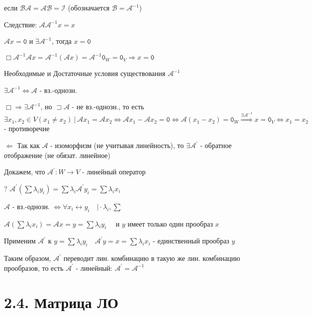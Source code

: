 \documentclass[12pt]{article}
\begin{document}
    если $\mathcal{B}\mathcal{A} = \mathcal{A}\mathcal{B} = \mathcal{I}$ (обозначается $\mathcal{B} = \mathcal{A}^{-1}$)

    Следствие: $\mathcal{A}\mathcal{A}^{-1} x = x$

    \Th $\mathcal{A}x = \texttt{0}$ и $\exists \mathcal{A}^{-1}$, тогда $x = \texttt{0}$

    $\Box \mathcal{A}^{-1}\mathcal{A} x = \mathcal{A}^{-1}(\mathcal{A} x) = \mathcal{A}^{-1} \texttt{0}_W = \texttt{0}_V \Longrightarrow x = \texttt{0}$

    \Th Необходимые и Достаточные условия существования $\mathcal{A}^{-1}$

    $\exists \mathcal{A}^{-1} \Longleftrightarrow \mathcal{A}$ - вз.-однозн.

    $\Box \Longrightarrow \exists \mathcal{A}^{-1}$, но $\sqsupset \mathcal{A}$ - не вз.-однозн., то есть
    $\exists x_1, x_2 \in V (x_1 \neq x_2) \ | \ \mathcal{A}x_1 = \mathcal{A}x_2 \Longleftrightarrow \mathcal{A}x_1 - \mathcal{A}x_2 = \texttt{0} \Longleftrightarrow
    \mathcal{A}(x_1 - x_2) = \texttt{0}_W \stackrel{\exists \mathcal{A}^{-1}}{\Longrightarrow} x = \texttt{0}_V \Longleftrightarrow x_1 = x_2$ - противоречие

    $\Longleftarrow$ Так как $\mathcal{A}$ - изоморфизм (не учитывая линейность), то $\exists \mathcal{A}^\prime$ - обратное отображение (не обязат. линейное)

    Докажем, что $\mathcal{A}^\prime : W \rightarrow V$ - линейный оператор

    ? $\mathcal{A}^\prime (\sum \lambda_i y_i) = \sum \lambda_i \mathcal{A}^\prime y_i = \sum \lambda_i x_i$

    $\mathcal{A}$ - вз.-однозн. $\Longleftrightarrow \forall x_i \longleftrightarrow y_i \quad \Big| \cdot \lambda_i, \sum$

    $\mathcal{A}(\sum \lambda_i x_i) = \mathcal{A} x = y = \sum \lambda_i y_i \quad$ и $y$ имеет только один прообраз $x$

    Применим $\mathcal{A}^\prime$ к $y = \sum \lambda_i y_i \quad \mathcal{A}^\prime y = x = \sum \lambda_i x_i$ - единственный прообраз $y$

    Таким образом, $\mathcal{A}^\prime$ переводит лин. комбинацию в такую же лин. комбинацию прообразов, то есть $\mathcal{A}^\prime$ - линейный: $\mathcal{A}^\prime = \mathcal{A}^{-1}$

    \section{2.4. Матрица ЛО}
\end{document}

